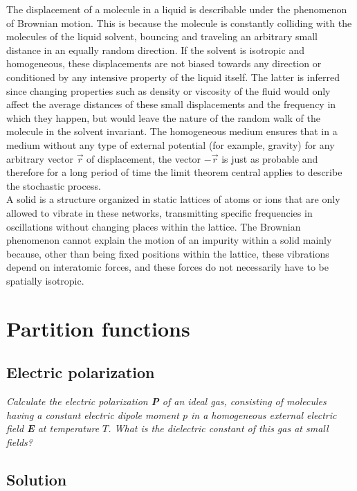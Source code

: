 \documentclass{article}
\begin{document}
The displacement of a molecule in a liquid is describable under the phenomenon of Brownian motion. This is because the molecule is constantly colliding with the molecules of the liquid solvent, bouncing and traveling an arbitrary small distance in an equally random direction. If the solvent is isotropic and homogeneous, these displacements are not biased towards any direction or conditioned by any intensive property of the liquid itself. The latter is inferred since changing properties such as density or viscosity of the fluid would only affect the average distances of these small displacements and the frequency in which they happen, but would leave the nature of the random walk of the molecule in the solvent invariant. The homogeneous medium ensures that in a medium without any type of external potential (for example, gravity) for any arbitrary vector $\vec{r}$ of displacement, the vector $-\vec{r}$ is just as probable and therefore for a long period of time the limit theorem central applies to describe the stochastic process.\\

A solid is a structure organized in static lattices of atoms or ions that are only allowed to vibrate in these networks, transmitting specific frequencies in oscillations without changing places within the lattice. The Brownian phenomenon cannot explain the motion of an impurity within a solid mainly because, other than being fixed positions within the lattice, these vibrations depend on interatomic forces, and these forces do not necessarily have to be spatially isotropic.

\section{Partition functions}
\subsection{Electric polarization}
\textit{Calculate the electric polarization \textbf{P} of an ideal gas, consisting of molecules having a constant electric dipole moment $p$ in a homogeneous external electric field \textbf{E} at temperature $T$. What is the dielectric constant of this gas at small fields?}
\subsection*{Solution}
\end{document}
